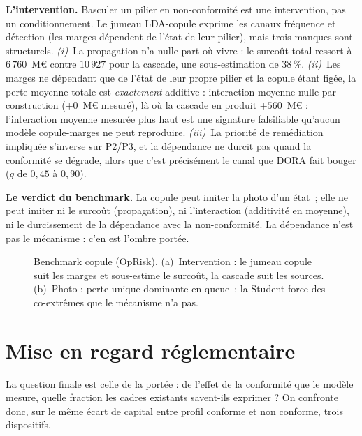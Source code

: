 \textbf{L'intervention.} Basculer un pilier en non-conformité est une intervention, pas un
conditionnement. Le jumeau LDA-copule exprime les canaux fréquence et détection (les marges
dépendent de l'état de leur pilier), mais trois manques sont structurels.
\emph{(i)}~La propagation n'a nulle part où vivre : le surcoût total ressort à
$6\,760$~M\euro{} contre $10\,927$ pour la cascade, une sous-estimation de $38\,\%$.
\emph{(ii)}~Les marges ne dépendant que de l'état de leur propre pilier et la copule étant
figée, la perte moyenne totale est \emph{exactement} additive : interaction moyenne nulle
par construction ($+0$~M\euro{} mesuré), là où la cascade en produit $+560$~M\euro{} :
l'interaction moyenne mesurée plus haut est une signature falsifiable qu'aucun modèle
copule-marges ne peut reproduire. \emph{(iii)}~La priorité de remédiation impliquée
s'inverse sur P2/P3, et la dépendance ne durcit pas quand la conformité se dégrade, alors
que c'est précisément le canal que DORA fait bouger ($g$ de $0{,}45$ à $0{,}90$).

\begin{cle}
\textbf{Le verdict du benchmark.} La copule peut imiter la photo d'un état~; elle ne
peut imiter ni le surcoût (propagation), ni l'interaction (additivité en moyenne), ni le
durcissement de la dépendance avec la non-conformité. La dépendance n'est pas le
mécanisme : c'en est l'ombre portée.
\end{cle}

\begin{figure}[htbp]\centering
{}
\caption{Benchmark copule (OpRisk). (a)~Intervention : le jumeau copule suit les marges et
sous-estime le surcoût, la cascade suit les sources. (b)~Photo : perte unique dominante en
queue~; la Student force des co-extrêmes que le mécanisme n'a pas.}
\label{fig:benchmark}
\end{figure}

\section{Mise en regard réglementaire}

La question finale est celle de la portée : de l'effet de la conformité que le modèle
mesure, quelle fraction les cadres existants savent-ils exprimer ? On confronte donc, sur
le même écart de capital entre profil conforme et non conforme, trois dispositifs.


